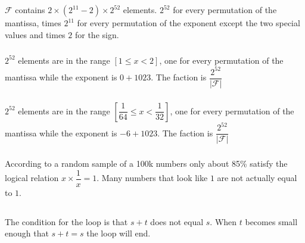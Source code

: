 \documentclass[12pt]{article}
\begin{document}
\subsection{}

\subsubsection{}

$\mathcal{F}$ contains $ 2 \times (2^{11} - 2) \times 2^{52}$ elements. $2^{52}$ for every permutation of the mantissa, times $2^{11}$ for every permutation of the exponent except the two special values and times $2$ for the sign.

\subsubsection{}

$2^{52}$ elements are in the range $[1 \leq x < 2]$, one for every permutation of the mantissa while the exponent is $0+1023$. The faction is $\dfrac{2^{52}}{\lvert \mathcal{F} \rvert}$

\subsubsection{}

$2^{52}$ elements are in the range $[\dfrac{1}{64} \leq x < \dfrac{1}{32}]$, one for every permutation of the mantissa while the exponent is $-6+1023$. The faction is $\dfrac{2^{52}}{\lvert \mathcal{F} \rvert}$

\subsubsection{}

According to a random sample of a 100k numbers only about 85\% satisfy the logical relation $x \times \dfrac{1}{x} = 1$. Many numbers that look like $1$ are not actually equal to $1$.

\begin{minipage}{\linewidth}

\end{minipage}

\subsection{} 

The condition for the loop is that $s+t$ does not equal $s$. When $t$ becomes small enough that $s+t = s$ the loop will end.
\end{document}
